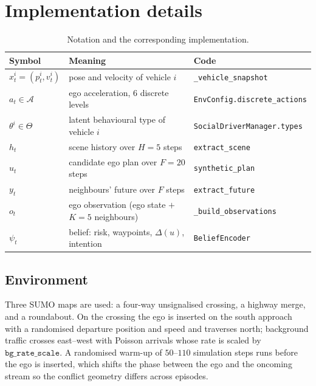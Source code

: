 \documentclass[conference]{IEEEtran}
\begin{document}
\section{Implementation details}
\label{app:impl}

\begin{table}[!t]
\caption{Notation and the corresponding implementation.}
\label{tab:notation}
\centering
\footnotesize
\begin{tabular}{|l|>{\raggedright\arraybackslash}p{}|>{\raggedright\arraybackslash}p{}|}
\hline
\textbf{Symbol} & \textbf{Meaning} & \textbf{Code} \\
\hline
$x^i_t = (p^i_t, v^i_t)$ & pose and velocity of vehicle $i$ & \texttt{\_vehicle\_snapshot} \\
\hline
$a_t \in \mathcal{A}$ & ego acceleration, 6 discrete levels & \texttt{EnvConfig.}\newline\texttt{discrete\_actions} \\
\hline
$\theta^i \in \Theta$ & latent behavioural type of vehicle $i$ & \texttt{SocialDriverManager.}\newline\texttt{types} \\
\hline
$h_t$ & scene history over $H=5$ steps & \texttt{extract\_scene} \\
\hline
$u_t$ & candidate ego plan over $F=20$ steps & \texttt{synthetic\_plan} \\
\hline
$y_t$ & neighbours' future over $F$ steps & \texttt{extract\_future} \\
\hline
$o_t$ & ego observation (ego state $+$ $K=5$ neighbours) & \texttt{\_build\_observations} \\
\hline
$\psi_t$ & belief: risk, waypoints, $\Delta(u)$, intention & \texttt{BeliefEncoder} \\
\hline
\end{tabular}
\end{table}

\subsection{Environment}

Three SUMO maps are used: a four-way unsignalised crossing, a highway merge,
and a roundabout. On the crossing the ego is inserted on the south approach with
a randomised departure position and speed and traverses north; background traffic
crosses east--west with Poisson arrivals whose rate is scaled by
$\texttt{bg\_rate\_scale}$. A randomised warm-up of $50$--$110$ simulation steps
runs before the ego is inserted, which shifts the phase between the ego and the
oncoming stream so the conflict geometry differs across episodes.
\end{document}
